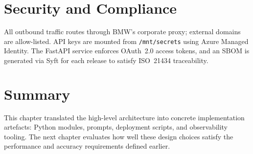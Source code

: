 \section{Security and Compliance}\label{sec:security}
All outbound traffic routes through BMW's corporate proxy; external domains are allow-listed.  API keys are mounted from \texttt{/mnt/secrets} using Azure Managed Identity.  The FastAPI service enforces OAuth~2.0 access tokens, and an SBOM is generated via Syft for each release to satisfy ISO~21434 traceability.

\section{Summary}
This chapter translated the high-level architecture into concrete implementation artefacts: Python modules, prompts, deployment scripts, and observability tooling.  The next chapter evaluates how well these design choices satisfy the performance and accuracy requirements defined earlier.